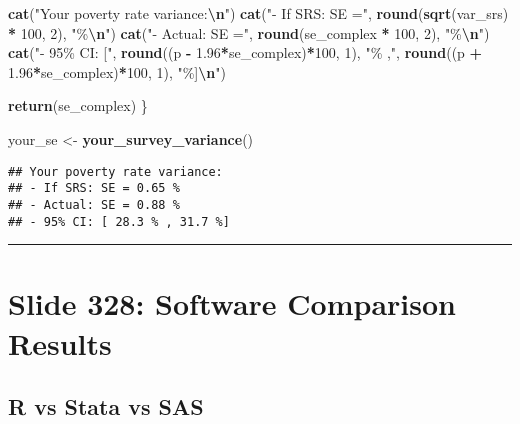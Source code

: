 \documentclass[
]{article}
\newenvironment{Shaded}{\begin{snugshade}}{\end{snugshade}}
\newcommand{\DecValTok}[1]{\textcolor[rgb]{0.00,0.00,0.81}{#1}}
\newcommand{\FloatTok}[1]{\textcolor[rgb]{0.00,0.00,0.81}{#1}}
\newcommand{\FunctionTok}[1]{\textcolor[rgb]{0.13,0.29,0.53}{\textbf{#1}}}
\newcommand{\NormalTok}[1]{#1}
\newcommand{\OtherTok}[1]{\textcolor[rgb]{0.56,0.35,0.01}{#1}}
\newcommand{\SpecialCharTok}[1]{\textcolor[rgb]{0.81,0.36,0.00}{\textbf{#1}}}
\newcommand{\StringTok}[1]{\textcolor[rgb]{0.31,0.60,0.02}{#1}}
\begin{document}
\begin{Shaded}
\begin{Highlighting}[]
  \FunctionTok{cat}\NormalTok{(}\StringTok{"Your poverty rate variance:}\SpecialCharTok{\textbackslash{}n}\StringTok{"}\NormalTok{)}
  \FunctionTok{cat}\NormalTok{(}\StringTok{"{-} If SRS: SE ="}\NormalTok{, }\FunctionTok{round}\NormalTok{(}\FunctionTok{sqrt}\NormalTok{(var\_srs) }\SpecialCharTok{*} \DecValTok{100}\NormalTok{, }\DecValTok{2}\NormalTok{), }\StringTok{"\%}\SpecialCharTok{\textbackslash{}n}\StringTok{"}\NormalTok{)}
  \FunctionTok{cat}\NormalTok{(}\StringTok{"{-} Actual: SE ="}\NormalTok{, }\FunctionTok{round}\NormalTok{(se\_complex }\SpecialCharTok{*} \DecValTok{100}\NormalTok{, }\DecValTok{2}\NormalTok{), }\StringTok{"\%}\SpecialCharTok{\textbackslash{}n}\StringTok{"}\NormalTok{)}
  \FunctionTok{cat}\NormalTok{(}\StringTok{"{-} 95\% CI: ["}\NormalTok{, }\FunctionTok{round}\NormalTok{((p }\SpecialCharTok{{-}} \FloatTok{1.96}\SpecialCharTok{*}\NormalTok{se\_complex)}\SpecialCharTok{*}\DecValTok{100}\NormalTok{, }\DecValTok{1}\NormalTok{),}
      \StringTok{"\% ,"}\NormalTok{, }\FunctionTok{round}\NormalTok{((p }\SpecialCharTok{+} \FloatTok{1.96}\SpecialCharTok{*}\NormalTok{se\_complex)}\SpecialCharTok{*}\DecValTok{100}\NormalTok{, }\DecValTok{1}\NormalTok{), }\StringTok{"\%]}\SpecialCharTok{\textbackslash{}n}\StringTok{"}\NormalTok{)}
  
  \FunctionTok{return}\NormalTok{(se\_complex)}
\NormalTok{\}}

\NormalTok{your\_se }\OtherTok{\textless{}{-}} \FunctionTok{your\_survey\_variance}\NormalTok{()}
\end{Highlighting}
\end{Shaded}

\begin{verbatim}
## Your poverty rate variance:
## - If SRS: SE = 0.65 %
## - Actual: SE = 0.88 %
## - 95% CI: [ 28.3 % , 31.7 %]
\end{verbatim}

\begin{center}\rule{0.5\linewidth}{0.5pt}\end{center}

\section{Slide 328: Software Comparison
Results}\label{slide-328-software-comparison-results}

\subsection{R vs Stata vs SAS}\label{r-vs-stata-vs-sas}
\end{document}
